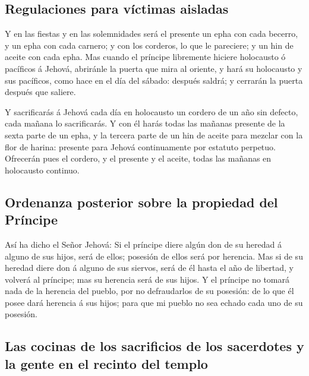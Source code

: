 \hypertarget{regulaciones-para-vuxedctimas-aisladas}{%
\subsection{Regulaciones para víctimas
aisladas}\label{regulaciones-para-vuxedctimas-aisladas}}

 Y en las fiestas y en las solemnidades será el presente
un epha con cada becerro, y un epha con cada carnero; y con los
corderos, lo que le pareciere; y un hin de aceite con cada epha.
 Mas cuando el príncipe libremente hiciere holocausto ó
pacíficos á Jehová, abriránle la puerta que mira al oriente, y hará su
holocausto y sus pacíficos, como hace en el día del sábado: después
saldrá; y cerrarán la puerta después que saliere.

 Y sacrificarás á Jehová cada día en holocausto un
cordero de un año sin defecto, cada mañana lo sacrificarás.
 Y con él harás todas las mañanas presente de la sexta
parte de un epha, y la tercera parte de un hin de aceite para mezclar
con la flor de harina: presente para Jehová continuamente por estatuto
perpetuo.  Ofrecerán pues el cordero, y el presente y el
aceite, todas las mañanas en holocausto continuo.

\hypertarget{ordenanza-posterior-sobre-la-propiedad-del-pruxedncipe}{%
\subsection{Ordenanza posterior sobre la propiedad del
Príncipe}\label{ordenanza-posterior-sobre-la-propiedad-del-pruxedncipe}}

 Así ha dicho el Señor Jehová: Si el príncipe diere algún
don de su heredad á alguno de sus hijos, será de ellos; posesión de
ellos será por herencia.  Mas si de su heredad diere don
á alguno de sus siervos, será de él hasta el año de libertad, y volverá
al príncipe; mas su herencia será de sus hijos.  Y el
príncipe no tomará nada de la herencia del pueblo, por no defraudarlos
de su posesión: de lo que él posee dará herencia á sus hijos; para que
mi pueblo no sea echado cada uno de su posesión.

\hypertarget{las-cocinas-de-los-sacrificios-de-los-sacerdotes-y-la-gente-en-el-recinto-del-templo}{%
\subsection{Las cocinas de los sacrificios de los sacerdotes y la gente
en el recinto del
templo}\label{las-cocinas-de-los-sacrificios-de-los-sacerdotes-y-la-gente-en-el-recinto-del-templo}}

